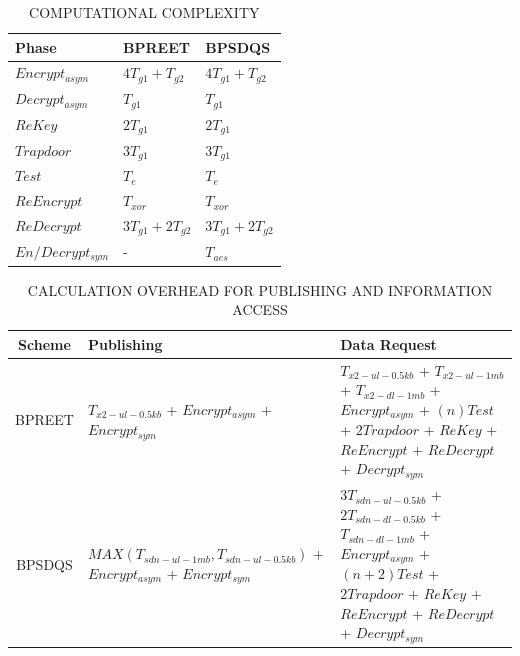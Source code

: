 \documentclass[journal,10pt]{IEEEtran}
\begin{document}
\begin{table}[t!]
\centering 
\caption{COMPUTATIONAL COMPLEXITY}
\begin{tabular}{|p{2cm}|p{2cm}|p{2cm}|}
    \hline
    Phase & BPREET & BPSDQS \\
    \hline
    $Encrypt_{asym}$ & $4T_{g1}+T_{g2}$ & $4T_{g1}+T_{g2}$ \\
    \hline
    $Decrypt_{asym}$ & $T_{g1}$ & $T_{g1}$ \\
    \hline
    $ReKey$ & $2T_{g1}$ & $2T_{g1}$ \\
    \hline
    $Trapdoor$ & $3T_{g1}$ & $3T_{g1}$ \\
    \hline
    $Test$ & $T_{e}$ & $T_{e}$ \\
    \hline
    $ReEncrypt$ & $T_{xor}$ & $T_{xor}$ \\
    \hline
    $ReDecrypt$ & $3T_{g1}+2T_{g2}$ & $3T_{g1}+2T_{g2}$ \\
    \hline
    $En/Decrypt_{sym}$ & - & $T_{aes}$ \\
    \hline
\end{tabular}
\label{tab:complexity}
\end{table}

\begin{table}[t!]
\centering 
\caption{CALCULATION OVERHEAD FOR PUBLISHING AND INFORMATION ACCESS }
\begin{tabular}{|c|p{7cm}|p{9cm}|}
    \hline
    Scheme & Publishing & Data Request \\
    \hline
    BPREET \cite{BPREET} & $T_{x2-ul-0.5kb}$ + $Encrypt_{asym}$ + $Encrypt_{sym}$ & $T_{x2-ul-0.5kb}$ + $T_{x2-ul-1mb}$ + $T_{x2-dl-1mb}$ + $Encrypt_{asym}$ + $(n)Test$ + $2Trapdoor$ + $ReKey$ + $ReEncrypt$ + $ReDecrypt$ + $Decrypt_{sym}$  \\
    \hline
    BPSDQS & $MAX(T_{sdn-ul-1mb}, T_{sdn-ul-0.5kb})$ + $Encrypt_{asym}$ + $Encrypt_{sym}$ & $3T_{sdn-ul-0.5kb}$ + $2T_{sdn-dl-0.5kb}$ + $T_{sdn-dl-1mb}$ + $Encrypt_{asym}$ + $(n+2)Test$ + $2Trapdoor$ + $ReKey$ + $ReEncrypt$ + $ReDecrypt$ + $Decrypt_{sym}$  \\
    \hline
\end{tabular}
\label{tab:request_overhead}
\end{table}
\end{document}
